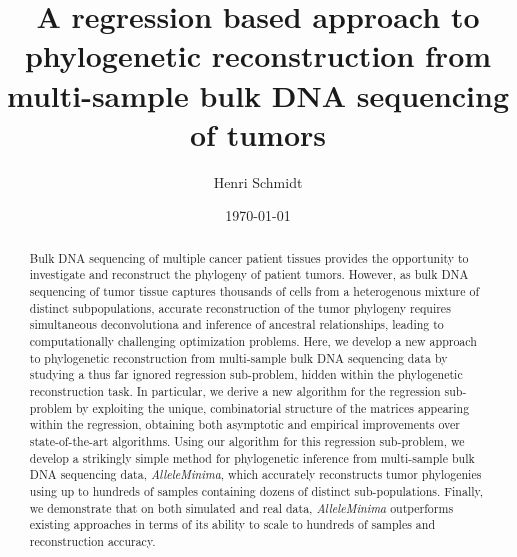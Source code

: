 \documentclass[10pt]{article}
\title{
    A regression based approach to phylogenetic reconstruction 
    from multi-sample bulk DNA sequencing of tumors
}
\author{Henri Schmidt}
\date{\today}
\newcommand{\ourmethod}{\textit{AlleleMinima}\xspace}
\begin{document}
\maketitle

\begin{abstract}
    Bulk DNA sequencing of multiple cancer patient tissues provides the opportunity to 
    investigate and reconstruct the phylogeny of patient tumors. However, as 
    bulk DNA sequencing of tumor tissue captures thousands of cells from a heterogenous 
    mixture of distinct subpopulations, accurate reconstruction of the tumor phylogeny
    requires simultaneous deconvolutiona and inference of ancestral relationships, leading
    to computationally challenging optimization problems. Here, we develop a new
    approach to phylogenetic reconstruction from multi-sample bulk DNA sequencing data by 
    studying a thus far ignored regression sub-problem, hidden within the phylogenetic
    reconstruction task. In particular, we derive a new algorithm for the 
    regression sub-problem by exploiting the unique, combinatorial structure of the matrices
    appearing within the regression, obtaining both asymptotic and empirical improvements
    over state-of-the-art algorithms. Using our algorithm for this regression sub-problem,
    we develop a strikingly simple method for phylogenetic inference from multi-sample bulk 
    DNA sequencing data, \ourmethod, which accurately reconstructs tumor phylogenies 
    using up to hundreds of samples containing dozens of distinct sub-populations. Finally, we
    demonstrate that on both simulated and real data, \ourmethod outperforms existing approaches
    in terms of its ability to scale to hundreds of samples and reconstruction accuracy.
\end{abstract}

\end{document}
